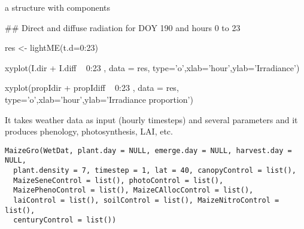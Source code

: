 \documentclass[letterpaper]{book}
\begin{document}
%
\begin{Value}
a  structure with components
\end{Value}
%
\begin{Examples}
\begin{ExampleCode}
## Direct and diffuse radiation for DOY 190 and hours 0 to 23

res <- lightME(t.d=0:23)

xyplot(I.dir + I.diff ~ 0:23 , data = res,
type='o',xlab='hour',ylab='Irradiance')

xyplot(propIdir + propIdiff ~ 0:23 , data = res,
type='o',xlab='hour',ylab='Irradiance proportion')
\end{ExampleCode}
\end{Examples}
%
\begin{Description}\relax
It takes weather data as input (hourly timesteps) and
several parameters and it produces phenology,
photosynthesis, LAI, etc.
\end{Description}
%
\begin{Usage}
\begin{verbatim}
MaizeGro(WetDat, plant.day = NULL, emerge.day = NULL, harvest.day = NULL,
  plant.density = 7, timestep = 1, lat = 40, canopyControl = list(),
  MaizeSeneControl = list(), photoControl = list(),
  MaizePhenoControl = list(), MaizeCAllocControl = list(),
  laiControl = list(), soilControl = list(), MaizeNitroControl = list(),
  centuryControl = list())
\end{verbatim}
\end{Usage}
%
\end{document}
